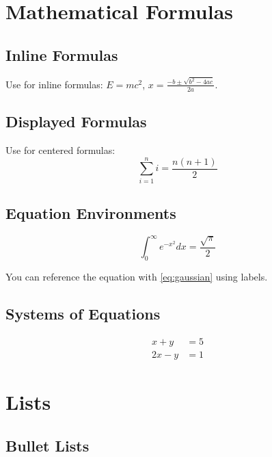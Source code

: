 \documentclass[]{csnotes}
\begin{document}
\section{Mathematical Formulas}

\subsection{Inline Formulas}

Use  for inline formulas:
\(E = mc^2\), \(x = \frac{-b \pm \sqrt{b^2 - 4ac}}{2a}\).

\subsection{Displayed Formulas}

Use \code{\textbackslash[...\textbackslash]} for centered formulas:
\[
\sum_{i=1}^{n} i = \frac{n(n+1)}{2}
\]

\subsection{Equation Environments}

\begin{equation}
    \int_0^\infty e^{-x^2} dx = \frac{\sqrt{\pi}}{2}
    \label{eq:gaussian}
\end{equation}

You can reference the equation with \eqref{eq:gaussian} using labels.

\subsection{Systems of Equations}

\begin{align}
    x + y &= 5 \\
    2x - y &= 1
\end{align}


\section{Lists}

\subsection{Bullet Lists}
\end{document}
